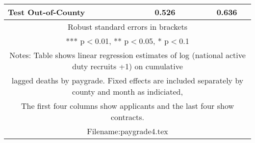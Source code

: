 \documentclass[]{article}
\begin{document}
\begin{tabular}{lcccc}
 Test Out-of-County &  & 0.526 &  & 0.636 \\ \hline
\multicolumn{5}{c}{ Robust standard errors in brackets} \\
\multicolumn{5}{c}{ *** p$<$0.01, ** p$<$0.05, * p$<$0.1} \\
\multicolumn{5}{c}{ Notes: Table shows linear regression estimates of log (national active duty recruits +1) on cumulative} \\
\multicolumn{5}{c}{ lagged deaths by paygrade. Fixed effects are included separately by county and month as indiciated,} \\
\multicolumn{5}{c}{ The first four columns show applicants and the last four show contracts.} \\
\multicolumn{5}{c}{ Filename:paygrade4.tex} \\
\end{tabular}
\end{document}
